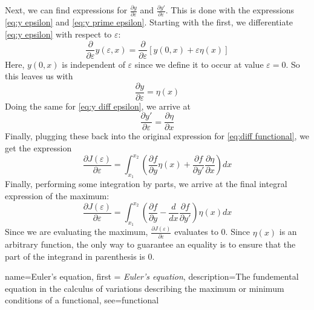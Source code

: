 \documentclass[12pt]{report}
\begin{document}
Next, we can find expressions for $\frac{\partial y}{\partial \varepsilon}$ and $\frac{\partial y'}{\partial \varepsilon}$. This is done with the expressions \eqref{eq:y epsilon} and \eqref{eq:y prime epsilon}. Starting with the first, we differentiate \eqref{eq:y epsilon} with respect to $\varepsilon$:
\begin{equation}\label{eq:y diff epsilon}
    \frac{\partial}{\partial \varepsilon}y(\varepsilon,x)=\frac{\partial}{\partial \varepsilon}\left[y(0,x)+\varepsilon\eta(x)\right]
\end{equation}
Here, $y(0,x)$ is independent of $\varepsilon$ since we define it to occur at value $\varepsilon=0$. So this leaves us with
\begin{equation}\label{eq:diff y diff epsilon}
     \frac{\partial y}{\partial \varepsilon}= \eta(x)
\end{equation}
Doing the same for \eqref{eq:y diff epsilon}, we arrive at
\begin{equation}\label{diff y' diff epsilon}
     \frac{\partial y'}{\partial \varepsilon}= \frac{\partial \eta}{\partial x}
\end{equation}
Finally, plugging these back into the original expression for \eqref{eq:diff functional}, we get the expression
\begin{equation}\label{eq:diff functional subs}
    \frac{\partial J(\varepsilon)}{\partial\varepsilon}= \int_{x_1}^{x_2}\left(\frac{\partial f}{\partial y}\eta(x)+\frac{\partial f}{\partial y'}\frac{\partial \eta}{\partial x}\right){dx}
\end{equation}
Finally, performing some integration by parts, we arrive at the final integral expression of the maximum:
\begin{equation}\label{eq:diff functional final}
    \frac{\partial J(\varepsilon)}{\partial\varepsilon}= \int_{x_1}^{x_2}\left(\frac{\partial f}{\partial y}-\frac{d}{dx}\frac{\partial f}{\partial y'}\right)\eta(x){dx}
\end{equation}
Since we are evaluating the maximum, $\frac{\partial J(\varepsilon)}{\partial\varepsilon}$ evaluates to 0. Since $\eta(x)$ is an arbitrary function, the only way to guarantee an equality is to ensure that the part of the integrand in parenthesis is 0.

{
    name=Euler's equation,
    first = {\textit{Euler's equation}},
    description={The fundemental equation in the calculus of variations describing the maximum or minimum conditions of a functional},
    see={functional}
}
\end{document}

